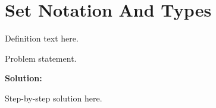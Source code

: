 \section{Set Notation And Types}


\begin{definition}[Term]
Definition text here.
\end{definition}

\begin{example}
Problem statement.

\textbf{Solution:}

Step-by-step solution here.
\end{example}
